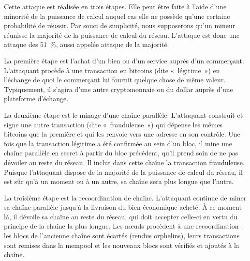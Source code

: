 
Cette attaque est réalisée en trois étapes. Elle peut être faite à l'aide d'une minorité de la puissance de calcul auquel cas elle ne possède qu'une certaine probabilité de réussir. Par souci de simplicité, nous supposerons qu'un mineur réunisse la majorité de la puissance de calcul du réseau. L'attaque est donc une attaque des 51~\%, aussi appelée attaque de la majorité.

La première étape est l'achat d'un bien ou d'un service auprès d'un commerçant. L'attaquant procède à une transaction en bitcoins (dite «~légitime~») en l'échange de quoi le commerçant lui fournit quelque chose de même valeur. Typiquement, il s'agira d'une autre cryptomonnaie ou du dollar auprès d'une plateforme d'échange.

La deuxième étape est le minage d'une chaîne parallèle. L'attaquant construit et signe une autre transaction (dite «~frauduleuse~») qui dépense les mêmes bitcoins que la première et qui les renvoie vers une adresse en son contrôle. Une fois que la transaction légitime a été confirmée au sein d'un bloc, il mine une chaîne parallèle en secret à partir du bloc précédent, qu'il prend soin de ne pas dévoiler au reste du réseau. Il inclut dans cette chaîne la transaction frauduleuse. Puisque l'attaquant dispose de la majorité de la puissance de calcul du réseau, il est sûr qu'à un moment ou à un autre, sa chaîne sera plus longue que l'autre.

La troisième étape est la recoordination de chaîne. L'attaquant continue de miner sa chaîne parallèle jusqu'à la livraison du bien économique acheté. À ce moment-là, il dévoile sa chaîne au reste du réseau, qui doit accepter celle-ci en vertu du principe de la chaîne la plus longue. Les nœuds procèdent à une recoordination~: les blocs de l'ancienne chaîne sont écartés (rendus orphelins), leurs transactions sont remises dans la mempool et les nouveaux blocs sont vérifiés et ajoutés à la chaîne.

